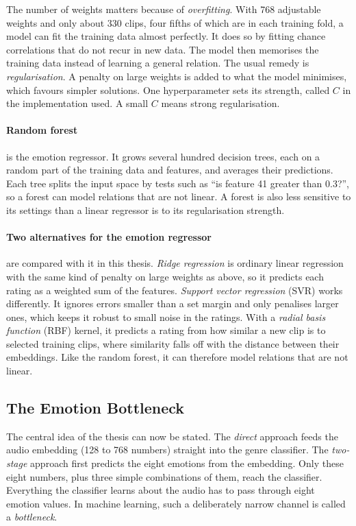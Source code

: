 The number of weights matters because of \emph{overfitting}. With 768 adjustable weights and only about 330 clips, four fifths of which are in each training fold, a model can fit the training data almost perfectly. It does so by fitting chance correlations that do not recur in new data. The model then memorises the training data instead of learning a general relation. The usual remedy is \emph{regularisation}. A penalty on large weights is added to what the model minimises, which favours simpler solutions. One hyperparameter sets its strength, called $C$ in the implementation used. A small $C$ means strong regularisation.

\paragraph{Random forest} is the emotion regressor. It grows several hundred decision trees, each on a random part of the training data and features, and averages their predictions. Each tree splits the input space by tests such as ``is feature 41 greater than 0.3?'', so a forest can model relations that are not linear. A forest is also less sensitive to its settings than a linear regressor is to its regularisation strength.

\paragraph{Two alternatives for the emotion regressor} are compared with it in this thesis. \emph{Ridge regression} is ordinary linear regression with the same kind of penalty on large weights as above, so it predicts each rating as a weighted sum of the features. \emph{Support vector regression} (SVR) works differently. It ignores errors smaller than a set margin and only penalises larger ones, which keeps it robust to small noise in the ratings. With a \emph{radial basis function} (RBF) kernel, it predicts a rating from how similar a new clip is to selected training clips, where similarity falls off with the distance between their embeddings. Like the random forest, it can therefore model relations that are not linear.

\subsection{The Emotion Bottleneck}
\label{subsec:fund_bottleneck}

The central idea of the thesis can now be stated. The \emph{direct} approach feeds the audio embedding (128 to 768 numbers) straight into the genre classifier. The \emph{two-stage} approach first predicts the eight emotions from the embedding. Only these eight numbers, plus three simple combinations of them, reach the classifier. Everything the classifier learns about the audio has to pass through eight emotion values. In machine learning, such a deliberately narrow channel is called a \emph{bottleneck}.

